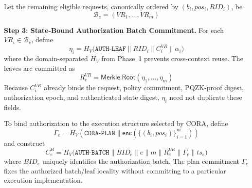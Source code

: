 \documentclass[lettersize,journal]{IEEEtran}
\begin{document}
Let the remaining eligible requests, canonically ordered by
$(b_i,pos_i,RID_i)$, be
\begin{equation}
\mathcal{B}_e=(VR_1,\ldots,VR_m)
\end{equation}

\medskip
\noindent\textbf{Step 3: State-Bound Authorization Batch Commitment.}
For each $VR_i\in\mathcal{B}_e$, define
\begin{equation}
\eta_i
=
H_V\big(
\texttt{AUTH-LEAF}\parallel
RID_i\parallel C_i^{VR}\parallel
\alpha_i
\big)
\label{eq:eta}
\end{equation}
where the domain-separated $H_V$ from Phase~1 prevents
cross-context reuse. The leaves are committed as
\begin{equation}
R_e^{VR}
=
\mathsf{Merkle.Root}
(\eta_1,\ldots,\eta_m)
\end{equation}
Because $C_i^{VR}$ already binds the request, policy commitment,
PQZK-proof digest, authorization epoch, and authenticated state digest,
$\eta_i$ need not duplicate these fields.

To bind authorization to the execution structure selected by CORA,
define
\begin{equation}
\Gamma_e=
H_V\!\left(
\texttt{CORA-PLAN}\parallel
\mathsf{enc}
\left(
\{(b_i,pos_i)\}_{i=1}^{m}
\right)
\right)
\label{eq:cora_plan}
\end{equation}
and construct
\begin{equation}
C_e^{B}
=
H_V\big(
\texttt{AUTH-BATCH}\parallel
BID_e\parallel e\parallel m\parallel
R_e^{VR}\parallel\Gamma_e\parallel ts_e
\big)
\label{eq:auth_batch}
\end{equation}
where $BID_e$ uniquely identifies the authorization batch.
The plan commitment $\Gamma_e$ fixes the authorized batch/leaf
locality without committing to a particular execution implementation.
\end{document}
